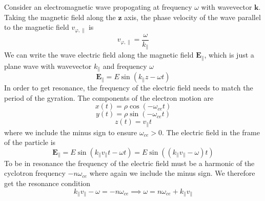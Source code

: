 Consider an electromagnetic wave propogating at frequency $\omega$ with wavevector $\bm{k}$. Taking the magnetic field along the $\bm{z}$ axis, the phase velocity of the wave parallel to the magnetic field $v_{\varphi,\parallel}$ is
\begin{equation}
	v_{\varphi,\parallel} = \frac{\omega}{k_{\parallel}}
\end{equation}
We can write the wave electric field along the magnetic field $\bm{E_{\parallel}}$, which is just a plane wave with wavevector $k_{\parallel}$ and frequency $\omega$
\begin{equation}
	\bm{E_{\parallel}} = E \sin \left( k_{\parallel}z - \omega t \right)
\end{equation}
In order to get resonance, the frequency of the electric field needs to match the period of the gyration. The components of the electron motion are
\begin{equation}
	x(t) = \rho \cos \left( -\omega_{ce} t \right)
\end{equation}
\begin{equation}
	y(t) = \rho \sin \left( -\omega_{ce} t \right)
\end{equation}
\begin{equation}
	z(t) = v_{\parallel} t
\end{equation}
where we include the minus sign to ensure $\omega_{ce} > 0$. The electric field in the frame of the particle is
\begin{equation}
	\bm{E_{\parallel}} = E \sin \left( k_{\parallel} v_{\parallel} t - \omega t \right) = E \sin \left( \left( k_{\parallel} v_{\parallel} - \omega \right) t \right)
\end{equation}
To be in resonance the frequency of the electric field must be a harmonic of the cyclotron frequency $-n \omega_{ce}$ where again we include the minus sign. We therefore get the resonance condition
\begin{equation}
	k_{\parallel} v_{\parallel} - \omega = -n \omega_{ce} \implies \omega = n \omega_{ce} + k_{\parallel} v_{\parallel}
\end{equation}

